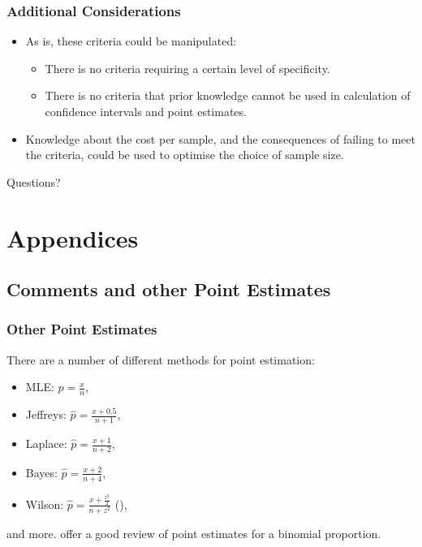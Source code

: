 \documentclass{beamer}\usepackage{knitr}
\begin{document}
\begin{frame}
  \frametitle{Additional Considerations}
  
  \begin{itemize}
    \item As is, these criteria could be manipulated:
      \begin{itemize}
        \item There is no criteria requiring a certain level of specificity.
        \item There is no criteria that prior knowledge cannot be used in calculation of confidence intervals and point estimates.
      \end{itemize}
    \item Knowledge about the cost per sample, and the consequences of failing to meet the criteria, could be used to optimise the choice of sample size.
  \end{itemize}
  
\end{frame}

\begin{frame}
{\Huge Questions?}
\end{frame}



\section{Appendices}


\subsection{Comments and other Point Estimates}

\begin{frame}
  \frametitle{Other Point Estimates}
  
  There are a number of different methods for point estimation:
  \begin{itemize}
    \item MLE: $\hat{p} = \frac{x}{n}$,
    \item Jeffreys: $\hat{p} = \frac{x + 0.5}{n + 1}$,
    \item Laplace: $\hat{p} = \frac{x + 1}{n + 2}$,
    \item Bayes: $\hat{p} = \frac{x + 2}{n + 4}$,
    \item Wilson: $\hat{p} = \frac{x + \frac{z^2}{2}}{n + z^2}$ (\cite{Wilson1927}),
  \end{itemize}
  and more. \cite{Chew1971} offer a good review of point estimates for a binomial proportion.
  
\end{frame}
\end{document}
